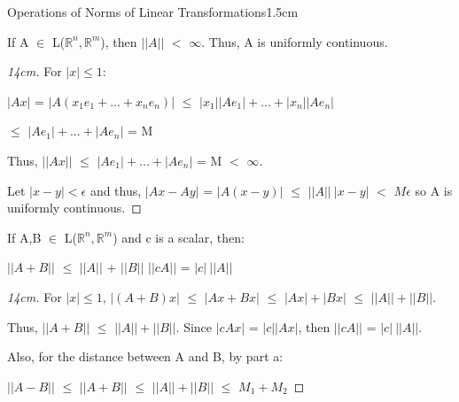     \begin{ltheorem}{Operations of Norms of Linear Transformations}{1.5cm}
        \item If A $\in$ L($\mathbb{R}^n,\mathbb{R}^m$), then $||A||$ $<$ $\infty$.
            Thus, A is uniformly continuous.
            
            \begin{proof}[14cm]
                For $|x| \leq 1$:

                \hspace{0.5cm}
                $|Ax|$
                = $|A(x_1e_1 + ... + x_ne_n)|$
                $\leq$ $|x_1| |Ae_1| + ... + |x_n| |Ae_n|$

                \hspace{1.4cm}
                $\leq$ $|Ae_1| + ... + |Ae_n|$
                = M

                Thus,
                $||Ax||$ $\leq$ $|Ae_1| + ... + |Ae_n|$ = M $<$ $\infty$.

                Let $|x-y| < \epsilon$ and thus,
                $|Ax - Ay|$
                = $|A(x-y)|$
                $\leq$ $||A|| \ |x-y|$
                $<$ $M\epsilon$ so A is uniformly continuous.
            \end{proof}

        \item If A,B $\in$ L($\mathbb{R}^n,\mathbb{R}^m$) and c is a scalar, then:
        
            \hspace{0.5cm}
            $||A+B||$ $\leq$ $||A||$ + $||B||$
            \hspace{1cm}
            $||cA||$ = $|c| \ ||A||$

            \begin{proof}[14cm]
                For $|x| \leq 1$,
                $|(A+B)x|$
                $\leq$ $|Ax+Bx|$
                $\leq$ $|Ax| + |Bx|$
                $\leq$ $||A|| + ||B||$.

                Thus, $||A+B||$ $\leq$ $||A|| + ||B||$.
                Since $|cAx|$ = $|c| |Ax|$, then $||cA||$ = $|c| \ ||A||$.

                Also, for the distance between A and B, by part a:

                \hspace{0.5cm}
                $||A-B||$
                $\leq$ $||A+B||$
                $\leq$ $||A|| + ||B||$
                $\leq$ $M_1 + M_2$
            \end{proof}


\end{ltheorem}
